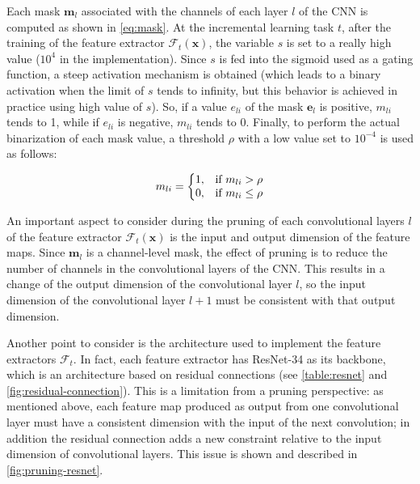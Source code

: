 Each mask $\mathbf{m}_l$ associated with the channels of each layer $l$ of the CNN is computed as shown in \autoref{eq:mask}.
At the incremental learning task $t$, after the training of the feature extractor $\mathcal{F}_t(\mathbf{x})$, the variable $s$ is set to a really high value ($10^{4}$ in the implementation).
Since $s$ is fed into the sigmoid used as a gating function, a steep activation mechanism is obtained (which leads to a binary activation when the limit of $s$ tends to infinity, but this behavior is achieved in practice using high value of $s$).
So, if a value $e_{li}$ of the mask $\mathbf{e}_l$ is positive, $m_{li}$ tends to 1, while if $e_{li}$ is negative, $m_{li}$ tends to 0.
Finally, to perform the actual binarization of each mask value, a threshold $\rho$ with a low value set to $10^{-4}$ is used as follows:

\begin{align*}
    m_{li}&=\left\{
        \begin{array}{@{}ll@{}}
            1, & \text{if } m_{li} > \rho\\
            0, & \text{if } m_{li} \leq \rho\\
        \end{array}\right.\\
\end{align*}

An important aspect to consider during the pruning of each convolutional layers $l$ of the feature extractor $\mathcal{F}_t(\mathbf{x})$ is the input and output dimension of the feature maps.
Since $\mathbf{m}_l$ is a channel-level mask, the effect of pruning is to reduce the number of channels in the convolutional layers of the CNN.
This results in a change of the output dimension of the convolutional layer $l$, so the input dimension of the convolutional layer $l+1$ must be consistent with that output dimension.

Another point to consider is the architecture used to implement the feature extractors $\mathcal{F}_t$. In fact, each feature extractor has ResNet-34 as its backbone, which is an architecture based on residual connections (see \autoref{table:resnet} and \autoref{fig:residual-connection}).
This is a limitation from a pruning perspective: as mentioned above, each feature map produced as output from one convolutional layer must have a consistent dimension with the input of the next convolution;
in addition the residual connection adds a new constraint relative to the input dimension of convolutional layers. This issue is shown and described in \autoref{fig:pruning-resnet}.


